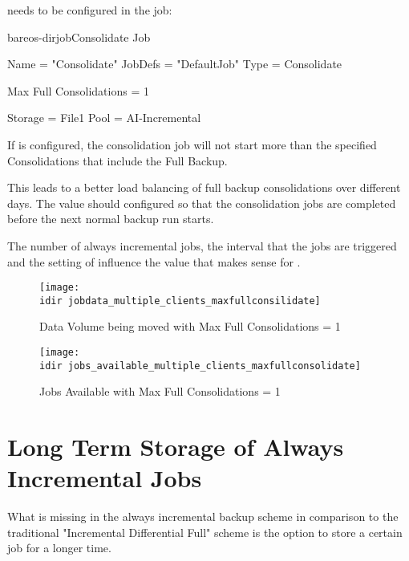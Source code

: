  needs to be configured in the  job:

\begin{bareosConfigResource}{bareos-dir}{job}{Consolidate}
Job {
  Name = "Consolidate"
  JobDefs = "DefaultJob"
  Type = Consolidate

  Max Full Consolidations = 1

  Storage = File1
  Pool = AI-Incremental
}
\end{bareosConfigResource}


If  is configured,
the consolidation job will not start more than the specified Consolidations that include the Full Backup.

This leads to a better load balancing of full backup consolidations over different days. 
The value should configured so that the consolidation jobs are completed before the next normal backup run starts.

The number of always incremental jobs, the interval that the jobs are triggered
and the setting of  influence the value
that makes sense for .

\begin{figure}[htbp]
\centering
\texttt{[image: \\idir jobdata\_multiple\_clients\_maxfullconsilidate]}
\caption{Data Volume being moved with Max Full Consolidations = 1}%
\end{figure}%

\begin{figure}[htbp]
\centering
\texttt{[image: \\idir jobs\_available\_multiple\_clients\_maxfullconsolidate]}
\caption{Jobs Available with Max Full Consolidations = 1}%
\end{figure}%


\section{Long Term Storage of Always Incremental Jobs}
\label{sec:AlwaysIncrementalLongTermStorage}

What is missing in the always incremental backup scheme in comparison to the traditional "Incremental Differential Full" scheme is the option to store a certain job for a longer time.

